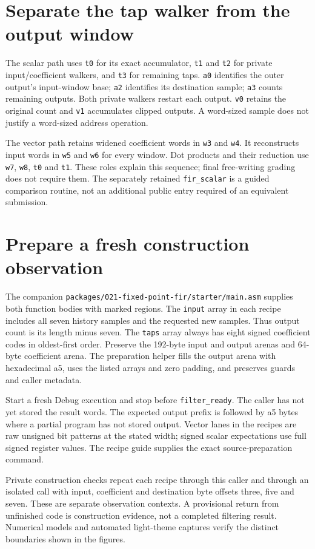 \section{Separate the tap walker from the output window}
The scalar path uses \texttt{t0} for its exact accumulator, \texttt{t1} and
\texttt{t2} for private input/coefficient walkers, and \texttt{t3} for remaining taps.
\texttt{a0} identifies the outer output's input-window base; \texttt{a2} identifies
its destination sample; \texttt{a3} counts remaining outputs. Both private walkers
restart each output. \texttt{v0} retains the original count and \texttt{v1} accumulates
clipped outputs. A word-sized sample does not justify a word-sized address operation.

The vector path retains widened coefficient words in \texttt{w3} and \texttt{w4}.
It reconstructs input words in \texttt{w5} and \texttt{w6} for every window. Dot
products and their reduction use \texttt{w7}, \texttt{w8}, \texttt{t0} and \texttt{t1}.
These roles explain this sequence; final free-writing grading does not require them.
The separately retained \texttt{fir\_scalar} is a guided comparison routine, not an
additional public entry required of an equivalent submission.

\section{Prepare a fresh construction observation}
The companion \texttt{packages/021-fixed-point-fir/starter/main.asm} supplies both function bodies
with marked regions. The \texttt{input} array in each recipe includes all seven
history samples and the requested new samples. Thus output count is its length minus
seven. The \texttt{taps} array always has eight signed coefficient codes in oldest-first
order. Preserve the 192-byte input and output arenas and 64-byte coefficient arena.
The preparation helper fills the output arena with hexadecimal a5, uses the listed
arrays and zero padding, and preserves guards and caller metadata.

Start a fresh Debug execution and stop before \texttt{filter\_ready}. The caller has
not yet stored the result words. The expected output prefix is followed by a5 bytes
where a partial program has not stored output. Vector lanes in the recipes are raw
unsigned bit patterns at the stated width; signed scalar expectations use full signed
register values. The recipe guide supplies the exact source-preparation command.

Private construction checks repeat each recipe through this caller and through an
isolated call with input, coefficient and destination byte offsets three, five and
seven. These are separate observation contexts. A provisional return from unfinished
code is construction evidence, not a completed filtering result. Numerical models and automated light-theme captures verify the distinct boundaries
shown in the figures.

